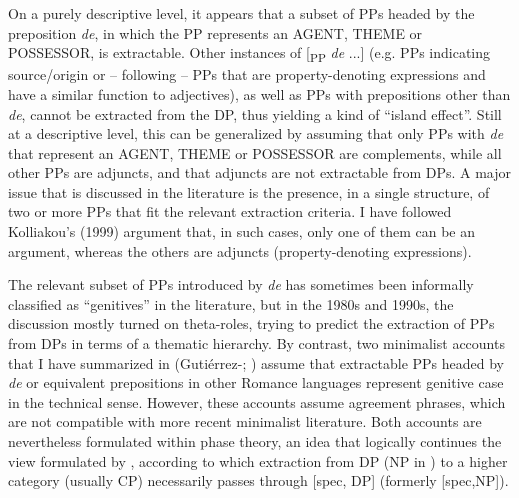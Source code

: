 \documentclass[output=paper]{langsci/langscibook}
\begin{document}
  On a purely descriptive level, it appears that a subset of PPs headed by the preposition \textit{de}, in which the PP represents an AGENT, THEME or POSSESSOR, is extractable. Other instances of [\textsubscript{PP} \textit{de} ...] (e.g. PPs indicating source/origin or – following \citealt{Kolliakou1999} – PPs that are property-denoting expressions and have a similar function to adjectives), as well as PPs with prepositions other than \textit{de}, cannot be extracted from the DP, thus yielding a kind of “island effect”. Still at a descriptive level, this can be generalized by assuming that only PPs with \textit{de} that represent an AGENT, THEME or POSSESSOR are complements, while all other PPs are adjuncts, and that adjuncts are not extractable from DPs. A major issue that is discussed in the literature is the presence, in a single structure, of two or more PPs that fit the relevant extraction criteria. I have followed Kolliakou’s (1999) argument that, in such cases, only one of them can be an argument, whereas the others are adjuncts (property-denoting expressions).

  The relevant subset of PPs introduced by \textit{de} has sometimes been informally classified as “genitives” in the literature, but in the 1980s and 1990s, the discussion mostly turned on theta-roles, trying to predict the extraction of PPs from DPs in terms of a thematic hierarchy. By contrast, two minimalist accounts that I have summarized in  (Gutiérrez-\citealt{Bravo2001}; \citealt{Cinque2014}) assume that extractable PPs headed by \textit{de} or equivalent prepositions in other Romance languages represent genitive case in the technical sense. However, these accounts assume agreement phrases, which are not compatible with more recent minimalist literature. Both accounts are nevertheless formulated within phase theory, an idea that logically continues the view formulated by \citet{Cinque1980}, according to which extraction from DP (NP in \citealt{Cinque1980}) to a higher category (usually CP) necessarily passes through [spec, DP] (formerly [spec,NP]). 
\end{document}
